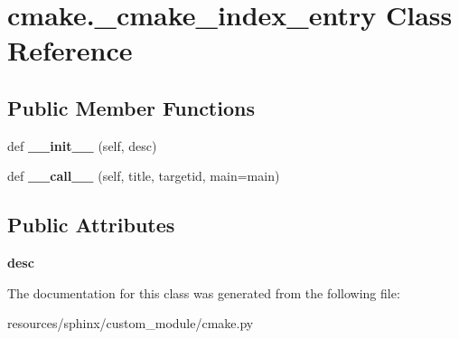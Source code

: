 \hypertarget{classcmake_1_1__cmake__index__entry}{}\section{cmake.\+\_\+cmake\+\_\+index\+\_\+entry Class Reference}
\label{classcmake_1_1__cmake__index__entry}
\subsection*{Public Member Functions}
\begin{DoxyCompactItemize}
\item 
def {\bfseries \+\_\+\+\_\+init\+\_\+\+\_\+} (self, desc)\hypertarget{classcmake_1_1__cmake__index__entry_a6bb8e17df4916fe1dc2f4912a46e3c7a}{}\label{classcmake_1_1__cmake__index__entry_a6bb8e17df4916fe1dc2f4912a46e3c7a}

\item 
def {\bfseries \+\_\+\+\_\+call\+\_\+\+\_\+} (self, title, targetid, main=\textquotesingle{}main\textquotesingle{})\hypertarget{classcmake_1_1__cmake__index__entry_a383f6275b69783c998f729d39ec6f20b}{}\label{classcmake_1_1__cmake__index__entry_a383f6275b69783c998f729d39ec6f20b}

\end{DoxyCompactItemize}
\subsection*{Public Attributes}
\begin{DoxyCompactItemize}
\item 
{\bfseries desc}\hypertarget{classcmake_1_1__cmake__index__entry_a07a63fe88514dffe16ae227623b64e57}{}\label{classcmake_1_1__cmake__index__entry_a07a63fe88514dffe16ae227623b64e57}

\end{DoxyCompactItemize}


The documentation for this class was generated from the following file\+:\begin{DoxyCompactItemize}
\item 
resources/sphinx/custom\+\_\+module/cmake.\+py\end{DoxyCompactItemize}
